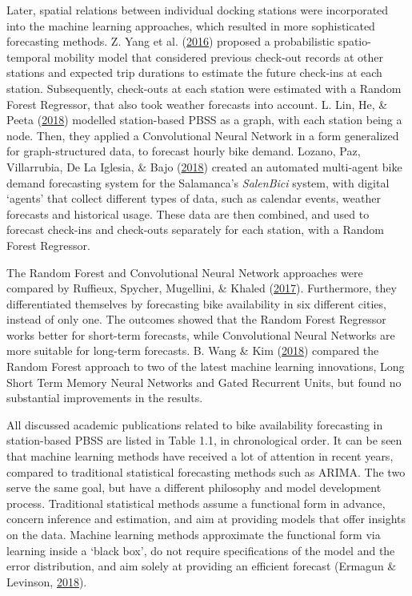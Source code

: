 \documentclass[12pt,oneside]{reedthesis}
\begin{document}
Later, spatial relations between individual docking stations were
incorporated into the machine learning approaches, which resulted in
more sophisticated forecasting methods. Z. Yang et al.
(\protect\hyperlink{ref-yang2016}{2016}) proposed a probabilistic
spatio-temporal mobility model that considered previous check-out
records at other stations and expected trip durations to estimate the
future check-ins at each station. Subsequently, check-outs at each
station were estimated with a Random Forest Regressor, that also took
weather forecasts into account. L. Lin, He, \& Peeta
(\protect\hyperlink{ref-lin2018}{2018}) modelled station-based PBSS as a
graph, with each station being a node. Then, they applied a
Convolutional Neural Network in a form generalized for graph-structured
data, to forecast hourly bike demand. Lozano, Paz, Villarrubia, De La
Iglesia, \& Bajo (\protect\hyperlink{ref-lozano2018}{2018}) created an
automated multi-agent bike demand forecasting system for the Salamanca's
\emph{SalenBici} system, with digital `agents' that collect different
types of data, such as calendar events, weather forecasts and historical
usage. These data are then combined, and used to forecast check-ins and
check-outs separately for each station, with a Random Forest Regressor.

The Random Forest and Convolutional Neural Network approaches were
compared by Ruffieux, Spycher, Mugellini, \& Khaled
(\protect\hyperlink{ref-ruffieux2017}{2017}). Furthermore, they
differentiated themselves by forecasting bike availability in six
different cities, instead of only one. The outcomes showed that the
Random Forest Regressor works better for short-term forecasts, while
Convolutional Neural Networks are more suitable for long-term forecasts.
B. Wang \& Kim (\protect\hyperlink{ref-wang2018}{2018}) compared the
Random Forest approach to two of the latest machine learning
innovations, Long Short Term Memory Neural Networks and Gated Recurrent
Units, but found no substantial improvements in the results.

All discussed academic publications related to bike availability
forecasting in station-based PBSS are listed in Table 1.1, in
chronological order. It can be seen that machine learning methods have
received a lot of attention in recent years, compared to traditional
statistical forecasting methods such as ARIMA. The two serve the same
goal, but have a different philosophy and model development process.
Traditional statistical methods assume a functional form in advance,
concern inference and estimation, and aim at providing models that offer
insights on the data. Machine learning methods approximate the
functional form via learning inside a `black box', do not require
specifications of the model and the error distribution, and aim solely
at providing an efficient forecast (Ermagun \& Levinson,
\protect\hyperlink{ref-ermagun2018}{2018}).
\end{document}
